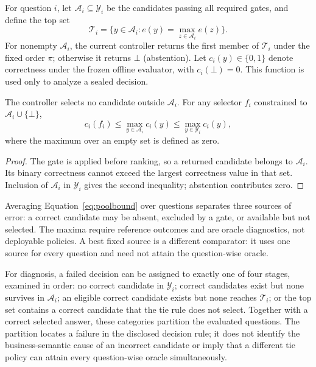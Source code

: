 \documentclass[information,article,submit,moreauthors]{Definitions/mdpi}
\begin{document}
For question $i$, let $\mathcal{A}_i\subseteq\mathcal{Y}_i$ be the candidates passing all required gates, and define the top set
\begin{equation}
\mathcal{T}_i=\{y\in\mathcal{A}_i:e(y)=\max_{z\in\mathcal{A}_i}e(z)\}.
\label{eq:topset}
\end{equation}
For nonempty $\mathcal{A}_i$, the current controller returns the first member of $\mathcal{T}_i$ under the fixed order $\pi$; otherwise it returns $\bot$ (abstention). Let $c_i(y)\in\{0,1\}$ denote correctness under the frozen offline evaluator, with $c_i(\bot)=0$. This function is used only to analyze a sealed decision.

\begin{Proposition}
\label{prop:pool-bound}
The controller selects no candidate outside $\mathcal{A}_i$. For any selector $f_i$ constrained to $\mathcal{A}_i\cup\{\bot\}$,
\begin{equation}
c_i(f_i)\leq \max_{y\in\mathcal{A}_i}c_i(y)
\leq \max_{y\in\mathcal{Y}_i}c_i(y),
\label{eq:poolbound}
\end{equation}
where the maximum over an empty set is defined as zero.
\end{Proposition}
\begin{proof}
The gate is applied before ranking, so a returned candidate belongs to $\mathcal{A}_i$. Its binary correctness cannot exceed the largest correctness value in that set. Inclusion of $\mathcal{A}_i$ in $\mathcal{Y}_i$ gives the second inequality; abstention contributes zero.
\end{proof}

Averaging Equation~\ref{eq:poolbound} over questions separates three sources of error: a correct candidate may be absent, excluded by a gate, or available but not selected. The maxima require reference outcomes and are oracle diagnostics, not deployable policies. A best fixed source is a different comparator: it uses one source for every question and need not attain the question-wise oracle.

For diagnosis, a failed decision can be assigned to exactly one of four stages, examined in order: no correct candidate in $\mathcal{Y}_i$; correct candidates exist but none survives in $\mathcal{A}_i$; an eligible correct candidate exists but none reaches $\mathcal{T}_i$; or the top set contains a correct candidate that the tie rule does not select. Together with a correct selected answer, these categories partition the evaluated questions. The partition locates a failure in the disclosed decision rule; it does not identify the business-semantic cause of an incorrect candidate or imply that a different tie policy can attain every question-wise oracle simultaneously.
\end{document}
